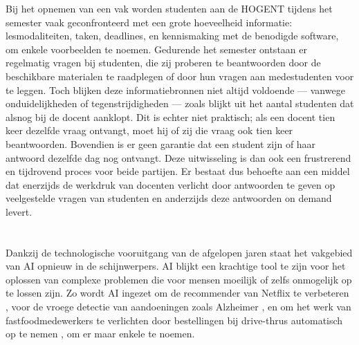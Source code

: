 Bij het opnemen van een vak worden studenten aan de HOGENT tijdens het semester vaak geconfronteerd met een grote hoeveelheid informatie: lesmodaliteiten, taken, deadlines, en kennismaking met de benodigde software, om enkele voorbeelden te noemen. Gedurende het semester ontstaan er regelmatig vragen bij studenten, die zij proberen te beantwoorden door de beschikbare materialen te raadplegen of door hun vragen aan medestudenten voor te leggen. Toch blijken deze informatiebronnen niet altijd voldoende --- vanwege onduidelijkheden of tegenstrijdigheden --- zoals blijkt uit het aantal studenten dat alsnog bij de docent aanklopt. Dit is echter niet praktisch; als een docent tien keer dezelfde vraag ontvangt, moet hij of zij die vraag ook tien keer beantwoorden. Bovendien is er geen garantie dat een student zijn of haar antwoord dezelfde dag nog ontvangt. Deze uitwisseling is dan ook een frustrerend en tijdrovend proces voor beide partijen. Er bestaat dus behoefte aan een middel dat enerzijds de werkdruk van docenten verlicht door antwoorden te geven op veelgestelde vragen van studenten en anderzijds deze antwoorden on demand levert. 

\section{}%
\label{sec:onderzoeksvraag}


Dankzij de technologische vooruitgang van de afgelopen jaren staat het vakgebied van \acrfull{AI} opnieuw in de schijnwerpers. \acrlong{AI} blijkt een krachtige tool te zijn voor het oplossen van complexe problemen die voor mensen moeilijk of zelfs onmogelijk op te lossen zijn. Zo wordt \acrshort{AI} ingezet om de \gls{recommender} van Netflix te verbeteren \autocite{Steck2021}, voor de vroege detectie van aandoeningen zoals Alzheimer \autocite{Lewis2024}, en om het werk van fastfoodmedewerkers te verlichten door bestellingen bij drive-thrus automatisch op te nemen \autocite{Kinnear2024}, om er maar enkele te noemen.

